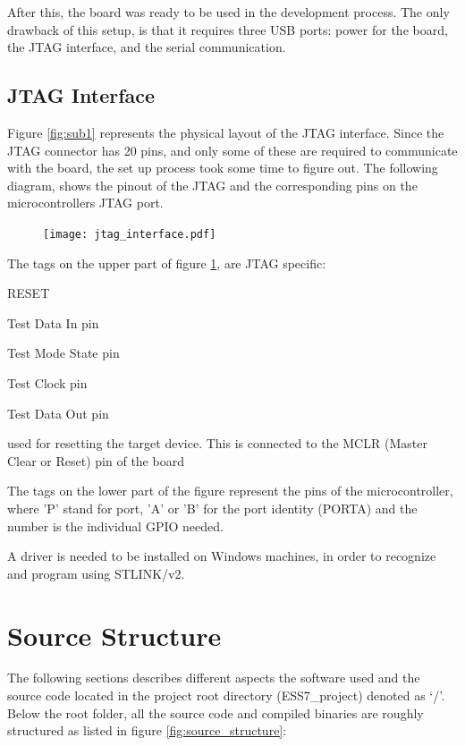 After this, the board was ready to be used in the development process.
The only drawback of this setup, is that it requires three USB ports:
power for the board, the JTAG interface, and the serial communication.

\subsection{JTAG Interface}
\label{ssec:JTAG_Interface}
Figure \ref{fig:sub1} represents the physical layout of the JTAG interface.
Since the JTAG connector has 20 pins, and only some of these are required
to communicate with the board, the set up process took some time to figure
out. The following diagram, shows the pinout of the JTAG and the 
corresponding pins on the microcontroller\textquotesingle s JTAG port.

\begin{figure}[H]
\centering
\texttt{[image: jtag\_interface.pdf]}
\label{fig:jtag_interface}
\end{figure}

The tags on the upper part of figure \ref{fig:jtag_interface}, are
JTAG specific:
\begin{labeling}{RESET}
	\item [\textbf{TDI}]
		Test Data In pin
	\item [\textbf{TMS}]
		Test Mode State pin
	\item [\textbf{TCK}]
		Test Clock pin
	\item [\textbf{TDO}]
		Test Data Out pin
	\item [\textbf{RESET}]
		used for resetting the target device. This is connected to the 
		MCLR (Master Clear or Reset) pin of the board
\end{labeling}

The tags on the lower part of the figure represent the pins of the 
microcontroller, where 'P' stand for port, 'A' or 'B' for the port
identity (PORTA) and the number is the individual GPIO needed.

A driver is needed to be installed on Windows machines, in order to
recognize and program using STLINK/v2.


\section{Source Structure}
The following sections describes different aspects the software used and
the source code located in the project root directory (ESS7\_project) denoted as `/'.
Below the root folder,
all the source code and compiled binaries are roughly structured as listed
in figure \ref{fig:source_structure}:

